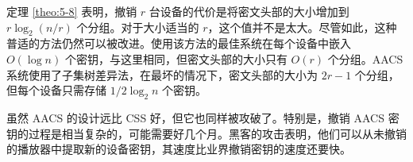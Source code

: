 定理 \ref{theo:5-8} 表明，撤销 $r$ 台设备的代价是将密文头部的大小增加到 $r\log_2(n/r)$ 个分组。对于大小适当的 $r$，这个值并不是太大。尽管如此，这种普适的方法仍然可以被改进。使用该方法的最佳系统在每个设备中嵌入 $O(\log n)$ 个密钥，与这里相同，但密文头部的大小只有 $O(r)$ 个分组。AACS 系统使用了子集树差异法，在最坏的情况下，密文头部的大小为 $2r-1$ 个分组，但每个设备只需存储 $1/2\log_2n$ 个密钥。

虽然 AACS 的设计远比 CSS 好，但它也同样被攻破了。特别是，撤销 AACS 密钥的过程是相当复杂的，可能需要好几个月。黑客的攻击表明，他们可以从未撤销的播放器中提取新的设备密钥，其速度比业界撤销密钥的速度还要快。